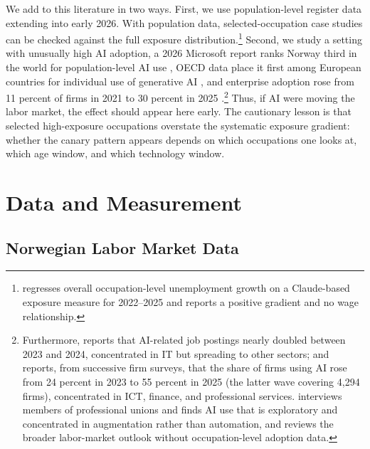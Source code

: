 \documentclass[12pt]{article}
\begin{document}
We add to this literature in two ways. First, we use population-level register data extending into early 2026. With population data, selected-occupation case studies can be checked against the full exposure distribution.\footnote{\citet{menon2026} regresses overall occupation-level unemployment growth on a Claude-based exposure measure for 2022--2025 and reports a positive gradient and no wage relationship.} Second, we study a setting with unusually high AI adoption, a 2026 Microsoft report ranks Norway third in the world for population-level AI use \citep{microsoft2026ai}, OECD data place it first among European countries for individual use of generative AI \citep{oecd2026ai}, and enterprise adoption rose from 11 percent of firms in 2021 to 30 percent in 2025 \citep{ssb2025ikt}.\footnote{Furthermore, \citet{kompetansebehovsutvalget2026} reports that AI-related job postings nearly doubled between 2023 and 2024, concentrated in IT but spreading to other sectors; and \citet{samfunnsok2026} reports, from successive firm surveys, that the share of firms using AI rose from 24 percent in 2023 to 55 percent in 2025 (the latter wave covering 4{,}294 firms), concentrated in ICT, finance, and professional services. \citet{nifu2024} interviews members of professional unions and finds AI use that is exploratory and concentrated in augmentation rather than automation, and \citet{nav2025} reviews the broader labor-market outlook without occupation-level adoption data.} Thus, if AI were moving the labor market, the effect should appear here early. The cautionary lesson is that selected high-exposure occupations overstate the systematic exposure gradient: whether the canary pattern appears depends on which occupations one looks at, which age window, and which technology window.

\section{Data and Measurement}\label{sec:data}

\subsection{Norwegian Labor Market Data}\label{sec:data:labor}
\end{document}
